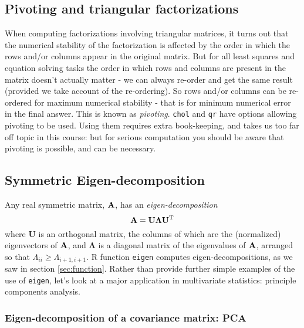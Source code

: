 \documentclass[10pt] {article}
\newcommand{\ts}{^{\rm T}}
\theoremstyle{definition}
\begin{document}
\subsection{Pivoting and triangular factorizations}
 
When computing factorizations involving triangular matrices, it turns out that the numerical stability of the factorization is affected by the order in which the rows and/or columns appear in the original matrix. But for all least squares and equation solving tasks the order in which rows and columns are present in the matrix doesn't actually matter - we can always re-order and get the same result (provided we take account of the re-ordering). So rows and/or columns can be re-ordered for maximum numerical stability - that is for minimum numerical error in the final answer. This is known as {\em pivoting}. {\tt chol} and {\tt qr} have options allowing pivoting to be used. Using them requires extra book-keeping, and takes us too far off topic in this course: but for serious computation you should be aware that pivoting is possible, and can be necessary.     
 
\subsection{Symmetric Eigen-decomposition}

Any real symmetric matrix, $\bf A$, has an {\em eigen-decomposition} 
$$
{\bf A} = {\bf U}\bm{\Lambda}{\bf U}\ts
$$
where {\bf U} is an orthogonal matrix, the columns of which are the (normalized) eigenvectors of $\bf A$, and $\bm \Lambda$ is a diagonal matrix of the eigenvalues of $\bf A$, arranged so that $\Lambda_{ii}\ge\Lambda_{i+1,i+1}$. R function {\tt eigen} computes eigen-decompositions, as we saw in section \ref{sec:function}. Rather than provide further simple examples of the use of {\tt eigen}, let's look at a major application in multivariate statistics: principle components analysis. 

\subsubsection{Eigen-decomposition of a covariance matrix: PCA}
\end{document}

